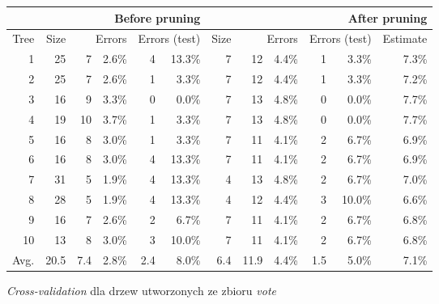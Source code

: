 \begin{figure}
\begin{tabular}{|r||r|rr|rr||r|rr|rr|r|}
\hline
&\multicolumn{5}{1||}{Before pruning}&\multicolumn{6}{1|}{After pruning} \\
\hline
Tree & 
Size & 
\multicolumn{2}{1|}{Errors} & 
\multicolumn{2}{1||}{Errors (test)} & 
Size & 
\multicolumn{2}{1|}{Errors} & 
\multicolumn{2}{1|}{Errors (test)} & 
Estimate \\
\hline\hline
    1 &   25 &    7 & 2.6\% &    4 & 13.3\% &    7 &   12 & 4.4\% &    1 &  3.3\%  &   7.3\%  \\
    2 &   25 &    7 & 2.6\% &    1 &  3.3\% &    7 &   12 & 4.4\% &    1 &  3.3\%  &   7.2\%  \\
    3 &   16 &    9 & 3.3\% &    0 &  0.0\% &    7 &   13 & 4.8\% &    0 &  0.0\%  &   7.7\%  \\
    4 &   19 &   10 & 3.7\% &    1 &  3.3\% &    7 &   13 & 4.8\% &    0 &  0.0\%  &   7.7\%  \\
    5 &   16 &    8 & 3.0\% &    1 &  3.3\% &    7 &   11 & 4.1\% &    2 &  6.7\%  &   6.9\%  \\
    6 &   16 &    8 & 3.0\% &    4 & 13.3\% &    7 &   11 & 4.1\% &    2 &  6.7\%  &   6.9\%  \\
    7 &   31 &    5 & 1.9\% &    4 & 13.3\% &    4 &   13 & 4.8\% &    2 &  6.7\%  &   7.0\%  \\
    8 &   28 &    5 & 1.9\% &    4 & 13.3\% &    4 &   12 & 4.4\% &    3 & 10.0\%  &   6.6\%  \\
    9 &   16 &    7 & 2.6\% &    2 &  6.7\% &    7 &   11 & 4.1\% &    2 &  6.7\%  &   6.8\%  \\
   10 &   13 &    8 & 3.0\% &    3 & 10.0\% &    7 &   11 & 4.1\% &    2 &  6.7\%  &   6.8\%  \\
\hline\hline
 Avg. & 20.5 &  7.4 & 2.8\% &  2.4 & 8.0\%  &  6.4 & 11.9 & 4.4\% &  1.5 &  5.0\%  &   7.1\%  \\
\hline
\end{tabular}
\caption{\emph{Cross-validation} dla drzew utworzonych ze zbioru \emph{vote}}
\label{p2t2-vote-trees-cv}
\end{figure}


